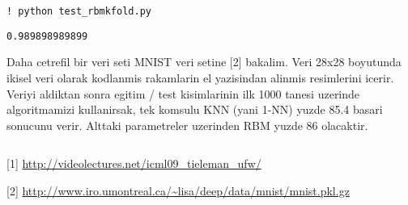 \documentclass[12pt,fleqn]{article}\usepackage{../common}
\begin{document}
\inputminted[fontsize=\footnotesize]{python}{rbmp.py}

\inputminted[fontsize=\footnotesize]{python}{test_rbmkfold.py}

\begin{verbatim}
! python test_rbmkfold.py
\end{verbatim}

\begin{verbatim}
0.989898989899
\end{verbatim}

Daha cetrefil bir veri seti MNIST veri setine [2] bakalim. Veri 28x28
boyutunda ikisel veri olarak kodlanmis rakamlarin el yazisindan alinmis
resimlerini icerir. Veriyi aldiktan sonra egitim / test kisimlarinin ilk
1000 tanesi uzerinde algoritmamizi kullanirsak, tek komsulu KNN (yani 1-NN)
yuzde 85.4 basari sonucunu verir. Alttaki parametreler uzerinden RBM yuzde
86 olacaktir.

\inputminted[fontsize=\footnotesize]{python}{test_mnist.py}

[1] \url{http://videolectures.net/icml09_tieleman_ufw/}

[2] \url{http://www.iro.umontreal.ca/~lisa/deep/data/mnist/mnist.pkl.gz}
\end{document}
